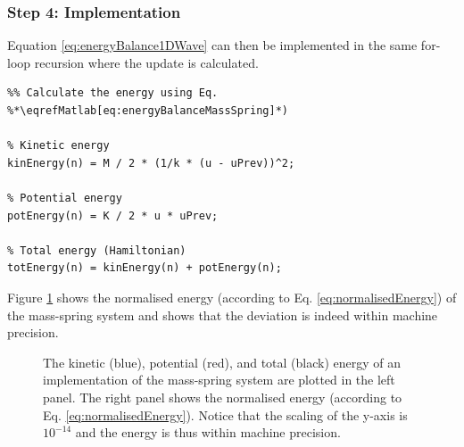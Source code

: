 {{{{\subsubsection{Step 4: Implementation}
Equation \eqref{eq:energyBalance1DWave} can then be implemented in the same for-loop recursion where the update is calculated.  
\setlstMAT
\begin{lstlisting}
%% Calculate the energy using Eq. %*\eqrefMatlab[eq:energyBalanceMassSpring]*) 

% Kinetic energy
kinEnergy(n) = M / 2 * (1/k * (u - uPrev))^2;

% Potential energy
potEnergy(n) = K / 2 * u * uPrev;

% Total energy (Hamiltonian)
totEnergy(n) = kinEnergy(n) + potEnergy(n);
\end{lstlisting}
Figure \ref{fig:energyMassSpring} shows the normalised energy (according to Eq. \eqref{eq:normalisedEnergy}) of the mass-spring system and shows that the deviation is indeed within machine precision. 

\begin{figure}[h]
    \centering
      \caption{The kinetic (blue), potential (red), and total (black) energy of an implementation of the mass-spring system are plotted in the left panel. The right panel shows the normalised energy (according to Eq. \eqref{eq:normalisedEnergy}). Notice that the scaling of the y-axis is $10^{-14}$ and the energy is thus within machine precision. \label{fig:energyMassSpring}}
\end{figure}

}}}}
